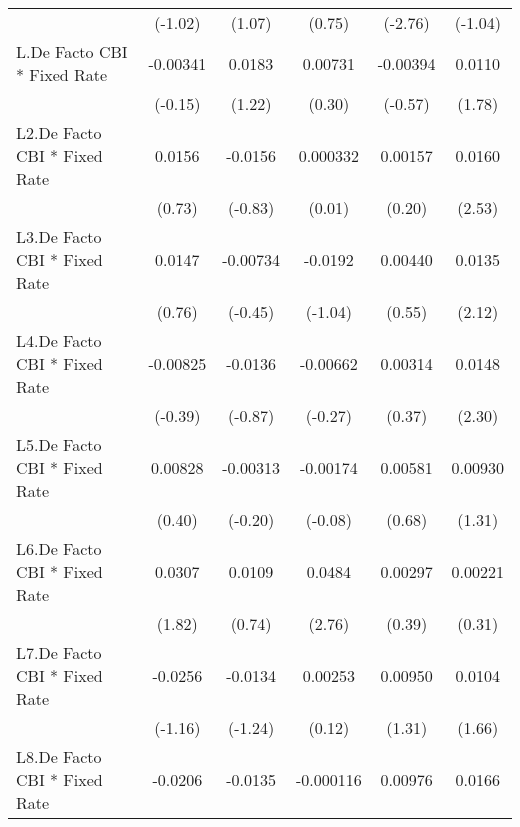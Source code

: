 {\begin{longtable}{l*{5}{c}}
                &  (-1.02)         &   (1.07)         &   (0.75)         &  (-2.76)         &  (-1.04)         \\
[1em]
L.De Facto CBI * Fixed Rate& -0.00341         &   0.0183         &  0.00731         & -0.00394         &   0.0110         \\
                &  (-0.15)         &   (1.22)         &   (0.30)         &  (-0.57)         &   (1.78)         \\
[1em]
L2.De Facto CBI * Fixed Rate&   0.0156         &  -0.0156         & 0.000332         &  0.00157         &   0.0160\sym{*}  \\
                &   (0.73)         &  (-0.83)         &   (0.01)         &   (0.20)         &   (2.53)         \\
[1em]
L3.De Facto CBI * Fixed Rate&   0.0147         & -0.00734         &  -0.0192         &  0.00440         &   0.0135\sym{*}  \\
                &   (0.76)         &  (-0.45)         &  (-1.04)         &   (0.55)         &   (2.12)         \\
[1em]
L4.De Facto CBI * Fixed Rate& -0.00825         &  -0.0136         & -0.00662         &  0.00314         &   0.0148\sym{*}  \\
                &  (-0.39)         &  (-0.87)         &  (-0.27)         &   (0.37)         &   (2.30)         \\
[1em]
L5.De Facto CBI * Fixed Rate&  0.00828         & -0.00313         & -0.00174         &  0.00581         &  0.00930         \\
                &   (0.40)         &  (-0.20)         &  (-0.08)         &   (0.68)         &   (1.31)         \\
[1em]
L6.De Facto CBI * Fixed Rate&   0.0307         &   0.0109         &   0.0484\sym{**} &  0.00297         &  0.00221         \\
                &   (1.82)         &   (0.74)         &   (2.76)         &   (0.39)         &   (0.31)         \\
[1em]
L7.De Facto CBI * Fixed Rate&  -0.0256         &  -0.0134         &  0.00253         &  0.00950         &   0.0104         \\
                &  (-1.16)         &  (-1.24)         &   (0.12)         &   (1.31)         &   (1.66)         \\
[1em]
L8.De Facto CBI * Fixed Rate&  -0.0206         &  -0.0135         &-0.000116         &  0.00976         &   0.0166\sym{*}  \\

\end{longtable}}
